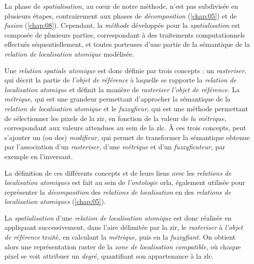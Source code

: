 La phase de \emph{spatialisation,} au cœur de notre méthode, n'est pas
subdivisée en plusieurs étapes, contrairement aux phases de
\emph{décomposition} (\autoref{chap:05}) et de \emph{fusion}
(\autoref{chap:08}). Cependant, la \emph{méthode} développée pour la
\emph{spatialisation} est composée de plusieurs parties, correspondant
à des traitements computationnels effectués séquentiellement, et
toutes porteuses d'une partie de la sémantique de la \emph{relation de
  localisation atomique} modélisée.

Une \emph{relation spatiale atomique} est donc définie par trois
concepts : un \emph{rasteriser,} qui décrit la partie de \emph{l'objet
  de référence} à laquelle se rapporte la \emph{relation de
  localisation atomique} et définit la manière de \emph{rasteriser}
\emph{l'objet de référence.} La \emph{métrique,} qui est une grandeur
permettant d'approcher la sémantique de la \emph{relation de
  localisation atomique} et le \emph{fuzzyfieur,} qui est une méthode
permettant de sélectionner les pixels de la \ac{zir}, en fonction de
la valeur de \emph{la métrique,} correspondant aux valeurs attendues
au sein de la \ac{zlc}. À ces trois concepts, peut s'ajouter un (ou
des) \emph{modifieur,} qui permet de transformer la sémantique obtenue
par l'association d'un \emph{rasteriser,} d'une \emph{métrique} et
d'un \emph{fuzzyficateur,} par exemple en l'inversant.

La définition de ces différents concepts et de leurs liens avec les
\emph{relations de localisation atomiques} est fait au sein de
\emph{l'ontologie} \ac{orla}, également utilisée pour représenter la
\emph{décomposition} des \emph{relations de localisation} en des
\emph{relations de localisation atomiques} (\autoref{chap:05}).

La \emph{spatialisation} d'une \emph{relation de localisation
  atomique} est donc réalisée en appliquant successivement, dans
l'aire délimitée par la \ac{zir}, le \emph{rasteriser} à \emph{l'objet
  de référence} traité, en calculant la \emph{métrique,} puis en la
\emph{fuzzyfiant.} On obtient alors une représentation raster de la
\emph{zone de localisation compatible,} où chaque pixel se voit
attribuer un \emph{degré,} quantifiant son appartenance à la \ac{zlc}.


